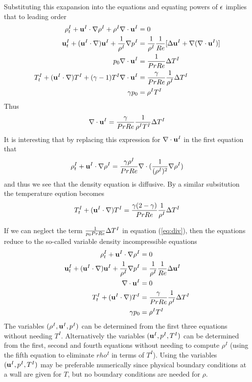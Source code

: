 \documentclass[10pt]{article}
\begin{document}
Substituting this exapansion into the equations and equating powers of $\epsilon$
implies that to leading order
\begin{align}
    \rho^I_t + {\bf u}^I\cdot\nabla\rho^I  +\rho^I \nabla\cdot{\bf u}^I &= 0 \\
   {\bf u}^I_t + ({\bf u}^I\cdot\nabla){\bf u}^I + {1\over\rho^I}\nabla p^I &= {1\over\rho^I} {1\over Re}[\Delta {\bf u}^I + \nabla(\nabla\cdot{\bf u}^I) ] \\
   p_0 \nabla\cdot{\bf u}^I &=  {1 \over Pr Re} \Delta T^I  \label{eq:div} \\
   T^I_t + ({\bf u}^I\cdot\nabla) T^I +(\gamma-1) T^I \nabla\cdot{\bf u}^I
       &= {\gamma \over Pr Re} { 1 \over \rho^I } \Delta T^I \\
   \gamma p_0 &= \rho^I T^I
\end{align}
Thus
\[
\nabla\cdot{\bf u}^I = {\gamma \over Pr Re} { 1 \over \rho^I T^I } \Delta T^I
\]
It is interesting that by replacing this expression for $\nabla\cdot{\bf u}^I$ in the first equation 
that
\[
    \rho^I_t + {\bf u}^I\cdot\nabla\rho^I  =  {\gamma \rho^I \over Pr Re} \nabla\cdot( {1\over (\rho^I)^2} \nabla \rho^I )
\]
and thus we see that the density equation is diffusive. By a similar subsitution the temperature eqution becomes
\[
   T^I_t + ({\bf u}^I\cdot\nabla) T^I 
       = {\gamma(2-\gamma) \over Pr Re} { 1 \over \rho^I } \Delta T^I
\]

If we can neglect the term ${1 \over p_0 Pr Re} \Delta T^I$ in equation (\ref{eq:div}), 
then the equations reduce to the
so-called variable density incompressible equations
\begin{align*}
    \rho^I_t + {\bf u}^I\cdot\nabla\rho^I  &= 0 \\
   {\bf u}^I_t + ({\bf u}^I\cdot\nabla){\bf u}^I + {1\over\rho^I}\nabla p^I &= {1\over\rho^I} {1\over Re} \Delta {\bf u}^I  \\
   \nabla\cdot{\bf u}^I &=  0  \\
   T^I_t + ({\bf u}^I\cdot\nabla) T^I  &= {\gamma \over Pr Re} { 1 \over \rho^I } \Delta T^I \\
   \gamma p_0 &= \rho^I T^I
\end{align*}
The variables $(\rho^I,{\bf u}^I,p^I)$ can be determined from the first three equations without needing $T^I$.
Alternatively the variables $({\bf u}^I,p^I,T^I)$ can be determined from the first, second and fourth
equations without needing to compute $\rho^I$ (using the fifth equation to eliminate $rho^I$ in terms
of $T^I$). Using the variables $({\bf u}^I,p^I,T^I)$ may be preferable numerically since physical boundary
conditions at a wall are given for $T$, but no boundary conditions are needed for $\rho$.
\end{document}
